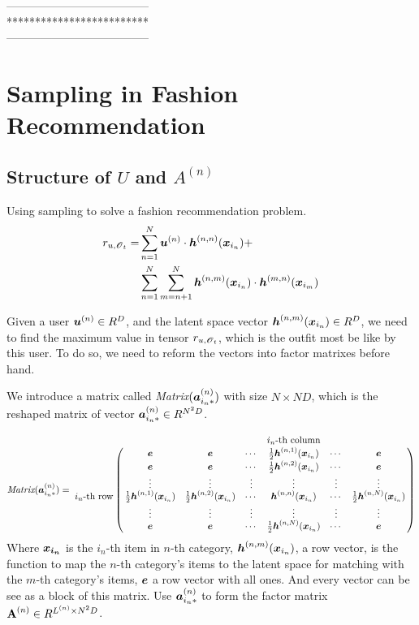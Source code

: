 \documentclass{article}
\newcommand{\T}[1]{\boldsymbol{\mathscr{\MakeUppercase{#1}}}}%
\newcommand{\V}[1]{{\bm{{\MakeLowercase{#1}}}}}%
\newcommand{\Varow}[1]{\V{a}^{(#1)}_{i_#1*}}
\newcommand{\Vh}[2]{\V{h}^{(#1,#2)}{(\V{x}_{i_#1}})}
\newcommand{\M}[1]{{\bm{\mathbf{\MakeUppercase{#1}}}}}%
\begin{document}
--------------------------------------\\

*************************\\

--------------------------------------\\

\section{Sampling in Fashion Recommendation}

\subsection{Structure of $U$ and $A^{(n)}$}
Using sampling to solve a fashion recommendation problem.
 \begin{align*}
r_{u,\T{O}_t} =
&\sum_{n=1}^{N}\V{u}^{(n)}\cdot\Vh{n}{n}+\\
&\sum_{n=1}^{N}\sum_{m=n+1}^{N}\Vh{n}{m}\cdot\Vh{m}{n}\\
\end{align*}

Given a user $\V{u}^{(n)}\in R^{D}$, and the latent space vector $\Vh{n}{m}\in R^{D}$, we need to find the maximum value in tensor $r_{u,\T{O}_t}$, which is the outfit most be like by this user. To do so, we need to reform the vectors into factor matrixes before hand.

We introduce a matrix called \emph{Matrix}$(\Varow{n})$ with size $N\times ND$, which is the reshaped matrix of vector $\Varow{n}\in R^{N^2D}$.

\begin{equation}
\label{eq:VMA}
\emph{Matrix}(\Varow{n})=
\bordermatrix{
~ & ~     & ~     & ~      & \text{$i_n$-th column} & ~      &   ~   \cr
~ & \V{e} & \V{e} & \cdots & \frac{1}{2}\Vh{n}{1}   & \cdots & \V{e} \cr
~ & \V{e} & \V{e} & \cdots & \frac{1}{2}\Vh{n}{2}   & \cdots & \V{e} \cr
~ & \vdots&\vdots&\vdots& \vdots& \vdots & \vdots\cr
\text{$i_n$-th row}& \frac{1}{2}\Vh{n}{1} &\frac{1}{2}\Vh{n}{2} &\cdots &\Vh{n}{n} &\cdots &\frac{1}{2}\Vh{n}{N}\cr
~ &\vdots&\vdots&\vdots&\vdots& \vdots & \vdots\cr
~ & \V{e} & \V{e} & \cdots & \frac{1}{2}\Vh{n}{N}   & \cdots & \V{e} \cr
}
\end{equation}
Where $\V{x_{i_n}}$ is the $i_n$-th item in $n$-th category, $\Vh{n}{m}$, a row vector, is the function to map the $n$-th category's items to the latent space for matching with the $m$-th category's items, $\V{e}$ a row vector with all ones. And every vector can be see as a block of this matrix. Use $\Varow{n}$ to form the factor matrix $\M{A}^{(n)}\in R^{L^{(n)}\times{N^2D}}$.
\end{document}
